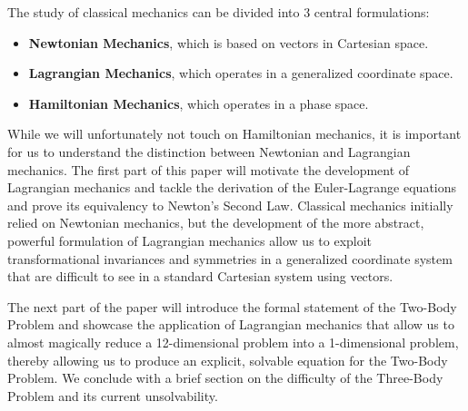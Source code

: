 \documentclass[10pt, psamsfonts]{amsart}
\theoremstyle{definition}
\theoremstyle{remark}
\numberwithin{equation}{section}
\begin{document}
The study of classical mechanics can be divided into 3 central formulations:
\begin{itemize}
  \item[] \textbf{Newtonian Mechanics}, which is based on vectors in Cartesian space.
  \item[] \textbf{Lagrangian Mechanics}, which operates in a generalized coordinate space.
  \item[] \textbf{Hamiltonian Mechanics}, which operates in a phase space.
\end{itemize}
While we will unfortunately not touch on Hamiltonian mechanics, it is important for us to understand the distinction between Newtonian and Lagrangian mechanics. The first part of this paper will motivate the development of Lagrangian mechanics and tackle the derivation of the Euler-Lagrange equations and prove its equivalency to Newton's Second Law. Classical mechanics initially relied on Newtonian mechanics, but the development of the more abstract, powerful formulation of Lagrangian mechanics allow us to exploit transformational invariances and symmetries in a generalized coordinate system that are difficult to see in a standard Cartesian system using vectors.

The next part of the paper will introduce the formal statement of the Two-Body Problem and showcase the application of Lagrangian mechanics that allow us to almost magically reduce a 12-dimensional problem into a 1-dimensional problem, thereby allowing us to produce an explicit, solvable equation for the Two-Body Problem. We conclude with a brief section on the difficulty of the Three-Body Problem and its current unsolvability.
\end{document}
